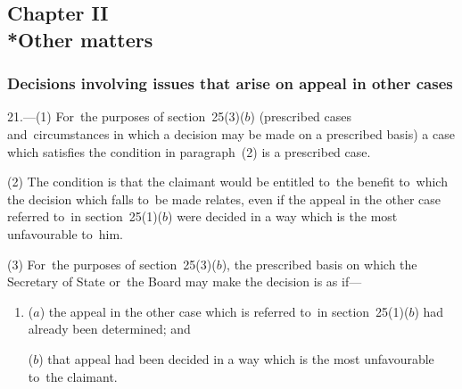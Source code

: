 \documentclass[12pt,a4paper]{article}
\begin{document}
\subsection[Chapter II --- Other matters]{Chapter II\\*Other matters}

\subsubsection[21. Decisions involving issues that arise on appeal in other cases]{Decisions involving issues that arise on appeal in other cases}

\renewcommand\parthead{--- Part~III Chapter II}

21.—(1) For~the purposes of section~25(3)($b$) (prescribed cases and~circumstances in which a decision may be made on a prescribed basis) a case which satisfies the condition in paragraph~(2) is a prescribed case.

(2) The condition is that the claimant would be entitled to~the benefit to~which the decision which falls to~be made relates, even if the appeal in the other case referred to~in section~25(1)($b$) were decided in a way which is the most unfavourable to~him.

(3) For~the purposes of section~25(3)($b$), the prescribed basis on which the Secretary of State 
or~the Board  %
may make the decision is as if—
\begin{enumerate}\item[]
($a$) the appeal in the other case which is referred to~in section~25(1)($b$) had already been determined; and

($b$) that appeal had been decided in a way which is the most unfavourable to~the claimant.
\end{enumerate}
\end{document}
